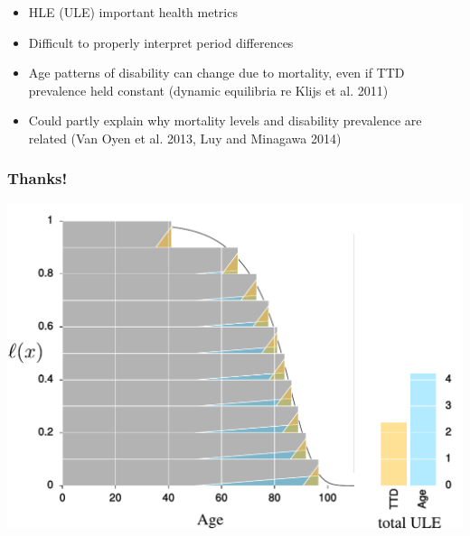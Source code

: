 \documentclass[20pt]{beamer}
\begin{document}
\begin{frame}[plain]
\Large
\begin{itemize}[<+->]
\item HLE (ULE) important health metrics
\item Difficult to properly interpret period differences 
\item Age patterns of disability can change due to mortality, even if TTD prevalence held constant (dynamic equilibria re Klijs et al. 2011)
\item Could partly explain why mortality levels and disability prevalence are related (Van Oyen et al. 2013, Luy and Minagawa 2014)
\end{itemize}
\end{frame}


\begin{frame}
\frametitle{Thanks!}
\begin{center}
\includegraphics[width=\linewidth]{Figures/Japan2010.pdf}
\end{center}
\end{frame}

\end{document}
